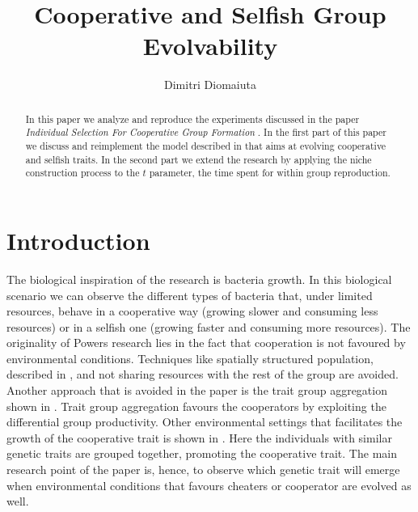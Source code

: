 \documentclass[runningheads]{llncs}
\begin{document}
%
\title{Cooperative and Selfish Group Evolvability}
%
%
\author{Dimitri Diomaiuta}
%
%
%
\maketitle              %
%
\begin{abstract}
In this paper we analyze and reproduce the experiments discussed in
the paper \textit{Individual
Selection For Cooperative Group Formation} \cite{groups}. In the first
part of this paper we discuss and reimplement the model described in
\cite{groups} that aims at evolving cooperative and selfish traits. In
the second part we extend the research by applying the niche construction
process to the $t$ parameter, the time spent for within group reproduction.
\end{abstract}
%
%
%

\section{Introduction}
The biological inspiration of the research is bacteria growth. In this
biological scenario we can observe the different types of bacteria
that, under limited resources, behave in a cooperative way (growing
slower and consuming less resources) or in a selfish one (growing faster and
consuming more resources).
The originality of Powers research \cite{groups} lies in
the fact that cooperation is not favoured by environmental
conditions. Techniques like spatially structured population, described
in \cite{b1,b2,b3,b5}, and not sharing resources with the rest of the
group are avoided. Another approach that is avoided in the
paper is the trait group aggregation shown in \cite{b6,b7,b8}. Trait
group aggregation favours the cooperators by exploiting the
differential group productivity. Other environmental settings that
facilitates the growth of the cooperative trait is shown in
\cite{b7,b8,b9}. Here the individuals with similar genetic traits are
grouped together, promoting the cooperative trait. The main research
point of the paper is, hence, to observe which genetic trait will
emerge when environmental conditions that favours cheaters or
cooperator are evolved as well.
\end{document}
